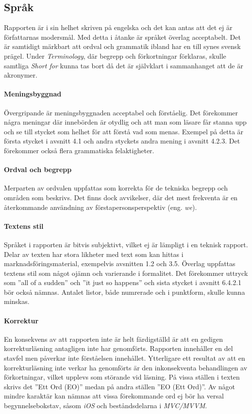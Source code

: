 
    \subsection{Språk} %
    \label{sub:sprak}
    Rapporten är i sin helhet skriven på engelska och det kan antas att det ej är författarnas modersmål. Med detta i åtanke är språket överlag acceptabelt. Det är samtidigt märkbart att ordval och grammatik ibland har en till synes svensk prägel. Under \emph{Terminology}, där begrepp och förkortningar förklaras, skulle samtliga \emph{Short for} kunna tas bort då det är självklart i sammanhanget att de är akronymer.

    \paragraph{Meningsbyggnad}
        Övergripande är meningsbyggnaden acceptabel och förståelig. Det förekommer några meningar där innebörden är otydlig och att man som läsare får stanna upp och se till stycket som helhet för att förstå vad som menas. Exempel på detta är första stycket i avsnitt 4.1 och andra styckets andra mening i avsnitt 4.2.3. Det förekommer också flera grammatiska felaktigheter.

    \paragraph{Ordval och begrepp}
        Merparten av ordvalen uppfattas som korrekta för de tekniska begrepp och områden som beskrivs. Det finns dock avvikelser, där det mest frekventa är en återkommande användning av förstapersonsperspektiv (eng. \emph{we}). 

    \paragraph{Textens stil}
        Språket i rapporten är bitvis subjektivt, vilket ej är lämpligt i en teknisk rapport. Delar av texten har stora likheter med text som kan hittas i marknadsföringsmaterial, exempelvis avsnitten 1.2 och 3.5. Överlag uppfattas textens stil som något ojämn och varierande i formalitet. Det förekommer uttryck som ''all of a sudden'' och ''it just so happens'' och sista stycket i avsnitt 6.4.2.1 bör också nämnas. Antalet listor, både numrerade och i punktform, skulle kunna minskas.

    \paragraph{Korrektur}
        En konsekvens av att rapporten inte är helt färdigställd är att en gedigen korrekturläsning antagligen inte har genomförts. Rapporten innehåller en del stavfel men påverkar inte förståelsen innehållet. Ytterligare ett resultat av att en korrekturläsning inte verkar ha genomförts är den inkonsekventa behandlingen av förkortningar, vilket upplevs som störande vid läsning. På vissa ställen i texten skrivs det ''Ett Ord (EO)'' medan på andra ställen ''EO (Ett Ord)''. Av något mindre karaktär kan nämnas att vissa förekommande ord ej bör ha versal begynnelsebokstav, såsom \emph{iOS} och beståndsdelarna i \emph{MVC/MVVM}. 

